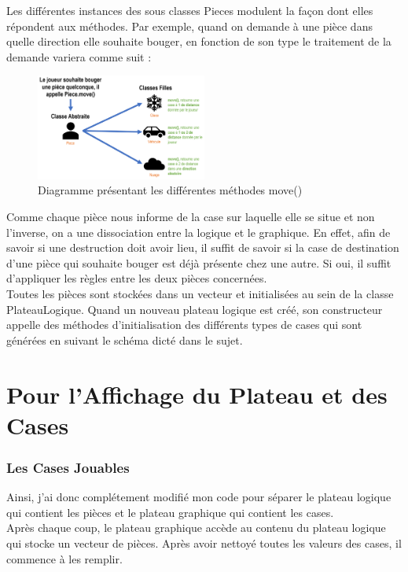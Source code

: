 \documentclass[titlepage]{report}
\begin{document}
Les différentes instances des sous classes Pieces modulent la façon dont elles répondent aux méthodes. Par exemple, quand on demande à une pièce dans quelle direction elle souhaite bouger, en fonction de son type le traitement de la demande variera comme suit : 
\begin{figure}
    \centering
    \includegraphics[width=0.5\textwidth]{img/schema_move.png}
    \caption{Diagramme présentant les différentes méthodes move()}
\end{figure}
Comme chaque pièce nous informe de la case sur laquelle elle se situe et non l’inverse, on a une dissociation entre la logique et le graphique. En effet, afin de savoir si une destruction doit avoir lieu, il suffit de savoir si la case de destination d’une pièce qui souhaite bouger est déjà présente chez une autre. Si oui, il suffit d’appliquer les règles entre les deux pièces concernées. \\

Toutes les pièces sont stockées dans un vecteur et initialisées au sein de la classe PlateauLogique. Quand un nouveau plateau logique est créé, son constructeur appelle des méthodes d’initialisation des différents types de cases qui sont générées en suivant le schéma dicté dans le sujet. 

\section{Pour l’Affichage du Plateau et des Cases}
\subsubsection{Les Cases Jouables}
Ainsi, j’ai donc complétement modifié mon code pour séparer le plateau logique qui contient les pièces et le plateau graphique qui contient les cases. \\

Après chaque coup, le plateau graphique accède au contenu du plateau logique qui stocke un vecteur de pièces. Après avoir nettoyé toutes les valeurs des cases, il commence à les remplir. \\
\end{document}
